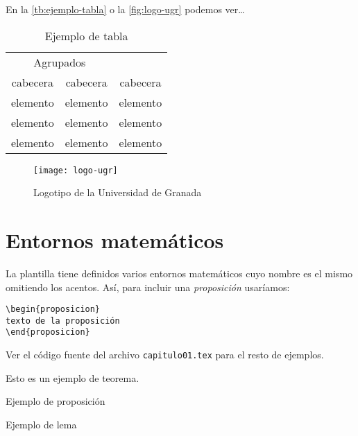 En la \autoref{tb:ejemplo-tabla} o la \autoref{fig:logo-ugr} podemos ver\ldots

\begin{table}[htpb]
  \centering
  \begin{tabular}{ccc} \toprule
    \multicolumn{2}{c}{Agrupados} \\ \cmidrule(r){1-2}
    cabecera & cabecera & cabecera          \\ \midrule
    elemento & elemento & elemento          \\ 
    elemento & elemento & elemento          \\ 
    elemento & elemento & elemento          \\ \bottomrule
  \end{tabular}
  \caption{Ejemplo de tabla}
  \label{tb:ejemplo-tabla}
\end{table}

\begin{figure}[htpb]
  \centering
  \texttt{[image: logo-ugr]}
  \caption{Logotipo de la Universidad de Granada}
  \label{fig:logo-ugr}
\end{figure}

\section{Entornos matemáticos}\label{sec:entornos-matematicos}

La plantilla tiene definidos varios entornos matemáticos cuyo nombre es el mismo omitiendo los acentos. Así, para incluir una \emph{proposición} usaríamos:

\begin{verbatim}
\begin{proposicion}
texto de la proposición
\end{proposicion} 
\end{verbatim}

Ver el código fuente del archivo \texttt{capitulo01.tex} para el resto de ejemplos.

\begin{teorema}\label{thm:teorema}
Esto es un ejemplo de teorema.
\end{teorema}

\begin{proposicion}
Ejemplo de proposición
\end{proposicion}

\begin{lema}
Ejemplo de lema
\end{lema}

